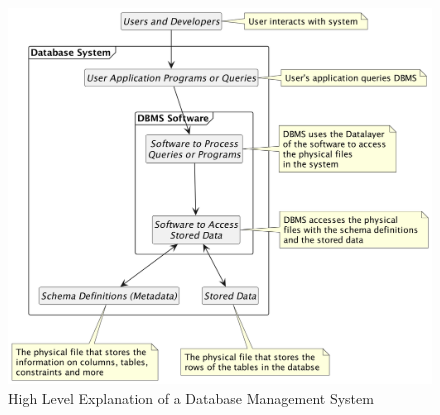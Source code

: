 \begin{figure}[h]
    \centering
    \includegraphics[width=1\textwidth]{content/1-relational-databases/figures/1.dbms-definitions.png}
    \caption{High Level Explanation of a Database Management System}
    \label{fig:1.dbms-definitions.png}
\end{figure}

